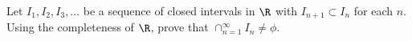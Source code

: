 Let $I_1,I_2,I_3,\ldots $ be a sequence of closed intervals in $\R$
with $I_{n+1}\subset I_n$ for each $n$. Using the completeness of
$\R$, prove that $\cap_{n=1}^{\infty}I_n\neq \phi$.

